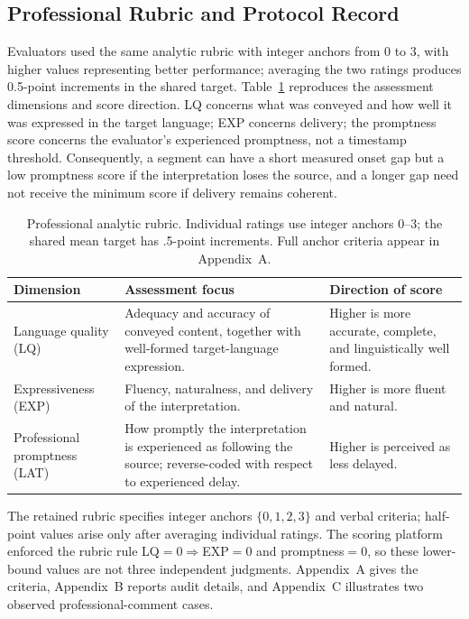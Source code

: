 \subsection{Professional Rubric and Protocol Record}
Evaluators used the same analytic rubric with integer anchors from 0 to 3, with higher values representing better performance; averaging the two ratings produces 0.5-point increments in the shared target. Table~\ref{tab:rubric} reproduces the assessment dimensions and score direction. LQ concerns what was conveyed and how well it was expressed in the target language; EXP concerns delivery; the promptness score concerns the evaluator's experienced promptness, not a timestamp threshold. Consequently, a segment can have a short measured onset gap but a low promptness score if the interpretation loses the source, and a longer gap need not receive the minimum score if delivery remains coherent.

\begin{table}[t]
\centering
\small
\caption{Professional analytic rubric. Individual ratings use integer anchors 0--3; the shared mean target has .5-point increments. Full anchor criteria appear in Appendix~A.}
\label{tab:rubric}
\begin{tabular}{>{\raggedright\arraybackslash}p{}>{\raggedright\arraybackslash}p{}>{\raggedright\arraybackslash}p{}}
\toprule
Dimension & Assessment focus & Direction of score \\
\midrule
Language quality (LQ) & Adequacy and accuracy of conveyed content, together with well-formed target-language expression. & Higher is more accurate, complete, and linguistically well formed. \\
Expressiveness (EXP) & Fluency, naturalness, and delivery of the interpretation. & Higher is more fluent and natural. \\
Professional promptness (LAT) & How promptly the interpretation is experienced as following the source; reverse-coded with respect to experienced delay. & Higher is perceived as less delayed. \\
\bottomrule
\end{tabular}
\end{table}

The retained rubric specifies integer anchors $\{0,1,2,3\}$ and verbal criteria; half-point values arise only after averaging individual ratings. The scoring platform enforced the rubric rule LQ$=0\Rightarrow$EXP$=0$ and promptness$=0$, so these lower-bound values are not three independent judgments. Appendix~A gives the criteria, Appendix~B reports audit details, and Appendix~C illustrates two observed professional-comment cases.

